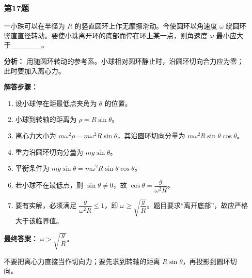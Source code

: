 \documentclass[12pt,a4paper]{ctexart}
\begin{document}
\subsubsection*{第17题}
\begin{tcolorbox}[colback=gray!2!white,colframe=black!60,title={题目}]
一小珠可以在半径为 \(R\) 的竖直圆环上作无摩擦滑动。今使圆环以角速度 \(\omega\) 绕圆环竖直直径转动。要使小珠离开环的底部而停在环上某一点，则角速度 \(\omega\) 最小应大于\_\_\_\_\_\_。\par
\end{tcolorbox}
\begin{tcolorbox}[colback=blue!2!white,colframe=blue!55!black,title={完整答案}]
\textbf{分析：}
用随圆环转动的参考系。小球相对圆环静止时，沿圆环切向合力应为零；此时要加入离心力。\par
\textbf{解答步骤：}
\begin{enumerate}
\item 设小球停在距最低点夹角为 \(\theta\) 的位置。
\item 小球到转轴的距离为 \(\rho=R\sin\theta\)。
\item 离心力大小为 \(m\omega^2\rho=m\omega^2R\sin\theta\)，其沿圆环切向分量为 \(m\omega^2R\sin\theta\cos\theta\)。
\item 重力沿圆环切向分量为 \(mg\sin\theta\)。
\item 平衡条件为 \(mg\sin\theta=m\omega^2R\sin\theta\cos\theta\)。
\item 若小球不在最低点，则 \(\sin\theta\neq 0\)，故 \(\cos\theta=\dfrac{g}{\omega^2R}\)。
\item 要有实解，必须满足 \(\dfrac{g}{\omega^2R}\le 1\)，即 \(\omega\ge \sqrt{\dfrac{g}{R}}\)。题目要求“离开底部”，故应严格大于该临界值。
\end{enumerate}
\textbf{最终答案：}
\(\omega>\sqrt{\dfrac{g}{R}}\)。\par
\end{tcolorbox}
\begin{tcolorbox}[colback=red!2!white,colframe=red!55!black,title={易错点}]
不要把离心力直接当作切向力；要先求到转轴的距离 \(R\sin\theta\)，再投影到圆环切向。\par
\end{tcolorbox}
\end{document}
